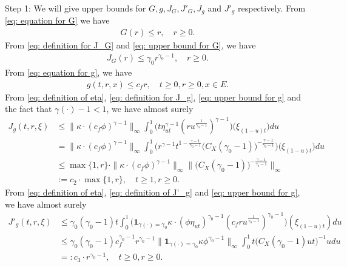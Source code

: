 \documentclass[12pt,a4paper]{amsart}
\theoremstyle{definition}
\numberwithin{equation}{section}
\begin{document}
Step 1:
We will give upper bounds for $G,g, J_G, J'_G, J_g$ and $J'_g$ respectively.
From \eqref{eq: equation for G} we have
\begin{align}\label{eq: upper bound for G}
	G(r)
	\leq r,
	\quad r \geq 0.
\end{align}	
From \eqref{eq: definition for J_G} and \eqref{eq: upper bound for G}, we have
\begin{align}\label{eq: upper bound for J_G}
	J_G(r)
	\leq \gamma_0 r^{\gamma_0 - 1},
	\quad r \geq 0.
\end{align}
From \eqref{eq: equation for g}, we have
\begin{align}\label{eq: upper bound for g}
	g(t,r, x) \leq c_f r,
	\quad t\geq 0, r \geq 0, x\in E.
\end{align}
From \eqref{eq: definition of eta}, \eqref{eq: definition for J_g}, \eqref{eq: upper bound for g} and the fact that $\gamma(\cdot) - 1 < 1$, we have almost surely
\begin{align}
	J_g(t,r, \xi)
	&\leq \|\kappa \cdot (c_f\phi)^{\gamma - 1} \|_\infty \int_0^1 \big(  t\eta_{ut}^{\gamma - 1} (ru^{\frac{1}{\gamma_0 - 1}} )^{\gamma-1}  \big) \big(  \xi_{(1-u)t} \big) du
	\\&= \| \kappa \cdot (c_f\phi)^{\gamma - 1} \|_\infty \int_0^1 \big(  r^{\gamma - 1}t^{1-\frac{\gamma - 1}{\gamma_0 - 1}}  \big( C_X (\gamma_0 - 1) \big)^{-\frac{\gamma - 1}{\gamma_0 - 1}}  \big) \big( \xi_{(1-u)t} \big) du
	\\& \leq \max\{1,r\} \cdot \| \kappa \cdot (c_f\phi)^{\gamma - 1} \|_\infty \Big\|  \big( C_X (\gamma_0 - 1) \big)^{-\frac{\gamma - 1}{\gamma_0 - 1}}\Big\|_\infty
	\\& := c_2 \cdot \max  \{1,r\},
	\quad t\geq 1, r\geq 0.
\end{align}
From \eqref{eq: definition of eta}, \eqref{eq: definition of J'_g} and \eqref{eq: upper bound for g}, we have almost surely
\begin{align}
	J'_g(t,r,\xi)
	&\leq \gamma_0 (\gamma_0 - 1) t \int_0^1 \big( \mathbf 1_{\gamma(\cdot) = \gamma_0} \kappa \cdot (\phi \eta_{ut})^{\gamma_0 - 1} (c_f ru^{\frac{1}{\gamma_0 - 1}})^{\gamma_0 - 1}\big) (\xi_{(1-u)t}) du
	\\&\leq \gamma_0(\gamma_0 - 1) c_f^{\gamma_0 - 1}r^{\gamma_0 - 1} \|  \mathbf 1_{\gamma(\cdot) = \gamma_0}  \kappa \phi^{\gamma_0 - 1} \|_\infty \int_0^1 t \big( C_X(\gamma_0 - 1) ut \big)^{- 1} u du
	\\&=: c_3 \cdot r^{\gamma_0 - 1},
	\quad t\geq 0, r\geq 0.
\end{align}
\end{document}
